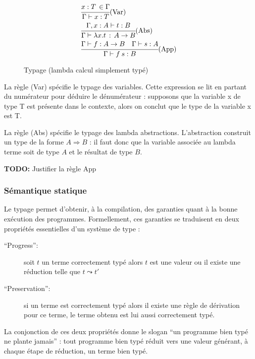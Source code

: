 \documentclass{article}
\newcommand{\TODO}[1]{\textbf{TODO:} #1}
\theoremstyle{definition}
\theoremstyle{remark}
\begin{document}
\begin{figure}

\begin{align*}
&  \cfrac{x:T\,\in\Gamma}
         {\Gamma\vdash x:T}\mbox{(Var)} 
  \\
&  \cfrac{\Gamma, x:A \vdash t:B}
         {\Gamma \vdash \lambda x. t \,:\, A\rightarrow B}\mbox{(Abs)} \\
&  \cfrac{\Gamma \vdash f : A\rightarrow B \quad
          \Gamma \vdash s : A}
         {\Gamma\vdash f\: s : B}\mbox{(App)}
\end{align*}

\caption{Typage (lambda calcul simplement typé)}
\label{fig:typage-simple}
\end{figure}

La règle (Var) spécifie le typage des variables. Cette expression se
lit en partant du numérateur pour déduire le dénumérateur : supposons
que la variable x de type T est présente dans le contexte, alors on
conclut que le type de la variable x est T.

La règle (Abs) spécifie le typage des lambda
abstractions. L'abstraction construit un type de la forme \(A
\Rightarrow B\) : il faut donc que la variable associée au lambda
terme soit de type \(A\) et le résultat de type \(B\).

\TODO{Justifier la règle App}
               

\subsubsection{Sémantique statique}

Le typage permet d'obtenir, à la compilation, des garanties quant à la
bonne exécution des programmes.  Formellement, ces garanties se traduisent en deux propriétés essentielles d'un système de type :
\begin{description}
\item[``Progress'':] soit \(t\) un terme correctement typé alors \(t\) est une valeur ou il
 existe une réduction telle que \(t \leadsto t'\)
\item[``Preservation'':] si un terme est correctement typé alors il existe une règle
 de dérivation pour ce terme, le terme obtenu est lui aussi correctement
 typé.
\end{description}

La conjonction de ces deux propriétés donne le slogan ``un programme
bien typé ne plante jamais''\citep{milner:no-wrong} : tout programme
bien typé réduit vers une valeur générant, à chaque étape de
réduction, un terme bien typé.
\end{document}
